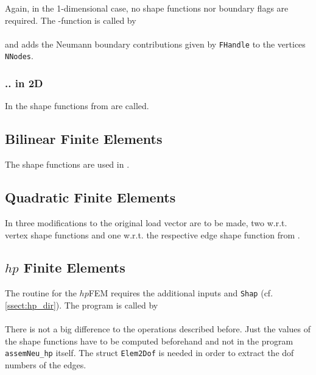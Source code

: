  Again, in the 1-dimensional case, no shape functions nor boundary flags are required. The -function is called by \\

 \\

 and adds the Neumann boundary contributions given by {\tt FHandle} to the vertices {\tt NNodes}.

\subsubsection{.. in 2D}

 In  the shape functions from  are called.



\subsection{Bilinear Finite Elements} 

 The shape functions  are used in .



\subsection{Quadratic Finite Elements} 

 In  three modifications to the original load vector are to be made, two w.r.t. vertex shape functions and one w.r.t. the respective edge shape function from .



\subsection{$hp$ Finite Elements} 

 The routine  for the $hp$FEM requires the additional inputs  and {\tt Shap} (cf. \ref{ssect:hp_dir}). The program is called by \\

 \\

 There is not a big difference to the operations described before. Just the values of the shape functions have to be computed beforehand and not in the program {\tt assemNeu\_hp} itself. The struct {\tt Elem2Dof} is needed in order to extract the dof numbers of the edges. \\

 